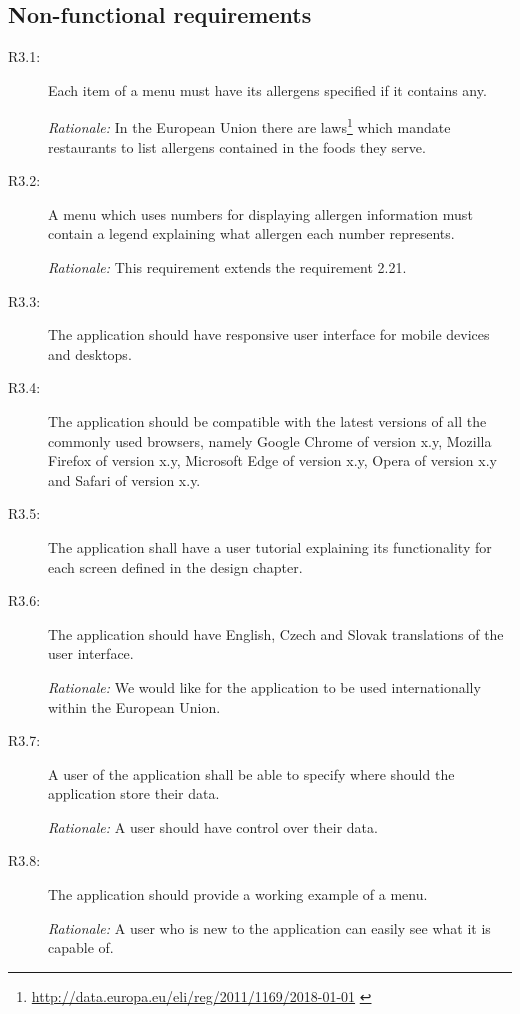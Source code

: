 \subsection{Non-functional requirements}

\begin{description}
    \item [R3.1:] Each item of a menu must have its allergens specified if it contains any.
    
    \emph{Rationale:} In the European Union there are laws\footnote{\url{http://data.europa.eu/eli/reg/2011/1169/2018-01-01}  \label{fnlabel}} which mandate restaurants to list allergens contained in the foods they serve.
    \item [R3.2:] A menu which uses numbers for displaying allergen information must contain a legend explaining what allergen each number represents.

    \emph{Rationale:} This requirement extends the requirement 2.21.
    \item [R3.3:] The application should have responsive user interface for mobile devices and desktops.
    \item [R3.4:] The application should be compatible with the latest versions of all the commonly used browsers, namely Google Chrome of version x.y, Mozilla Firefox of version x.y, Microsoft Edge of version x.y, Opera of version x.y and Safari of version x.y.
    \item [R3.5:] The application shall have a user tutorial explaining its functionality for each screen defined in the design chapter.
    \item [R3.6:] The application should have English, Czech and Slovak translations of the user interface.

    \emph{Rationale:} We would like for the application to be used internationally within the European Union.
    \item [R3.7:] A user of the application shall be able to specify where should the application store their data.

    \emph{Rationale:} A user should have control over their data.
    \item [R3.8:] The application should provide a working example of a menu.

    \emph{Rationale:} A user who is new to the application can easily see what it is capable of.
\end{description}

\vspace*{\fill}